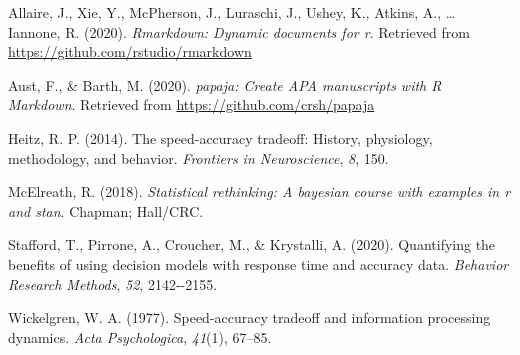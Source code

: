 \documentclass[
  english,
  ,jou,floatsintext]{apa6}
\newlength{\cslhangindent}
\newlength{\cslentryspacingunit} %
\newenvironment{CSLReferences}[2] %
 {%
  \setlength{\parindent}{0pt}
  \ifodd #1
  \let\oldpar\par
  \def\par{\hangindent=\cslhangindent\oldpar}
  \fi
  \setlength{\parskip}{#2\cslentryspacingunit}
 }%
 {}
\begin{document}
\hypertarget{refs}{}
\begin{CSLReferences}{1}{0}
\leavevmode{}%
Allaire, J., Xie, Y., McPherson, J., Luraschi, J., Ushey, K., Atkins, A., \ldots{} Iannone, R. (2020). \emph{Rmarkdown: Dynamic documents for r}. Retrieved from \url{https://github.com/rstudio/rmarkdown}

\leavevmode{}%
Aust, F., \& Barth, M. (2020). \emph{{papaja}: {Create} {APA} manuscripts with {R Markdown}}. Retrieved from \url{https://github.com/crsh/papaja}

\leavevmode{}%
Heitz, R. P. (2014). The speed-accuracy tradeoff: History, physiology, methodology, and behavior. \emph{Frontiers in Neuroscience}, \emph{8}, 150.

\leavevmode{}%
McElreath, R. (2018). \emph{Statistical rethinking: A bayesian course with examples in r and stan}. Chapman; Hall/CRC.

\leavevmode{}%
Stafford, T., Pirrone, A., Croucher, M., \& Krystalli, A. (2020). Quantifying the benefits of using decision models with response time and accuracy data. \emph{Behavior Research Methods}, \emph{52}, 2142-\/-2155.

\leavevmode{}%
Wickelgren, W. A. (1977). Speed-accuracy tradeoff and information processing dynamics. \emph{Acta Psychologica}, \emph{41}(1), 67--85.

\end{CSLReferences}
\end{document}
